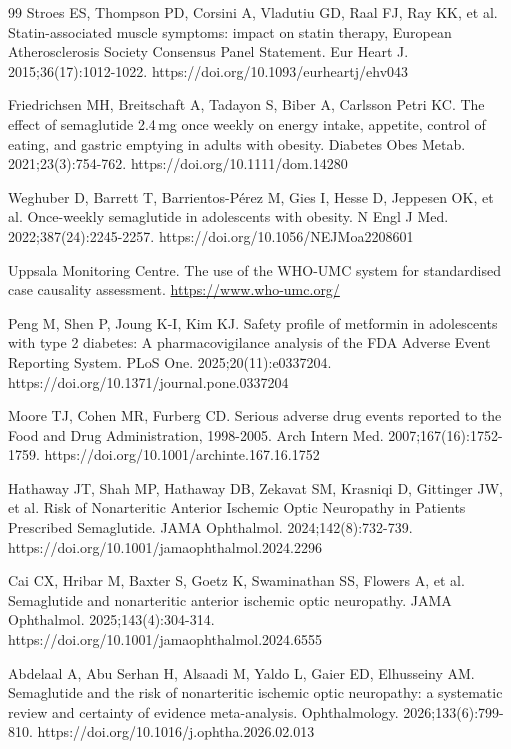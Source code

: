 \documentclass[10pt,a4paper]{article}
\begin{document}
\begin{thebibliography}{99}
Stroes ES, Thompson PD, Corsini A, Vladutiu GD, Raal FJ, Ray KK, et al.
Statin-associated muscle symptoms: impact on statin therapy, European Atherosclerosis Society Consensus Panel Statement.
Eur Heart J. 2015;36(17):1012-1022.
https://doi.org/10.1093/eurheartj/ehv043

Friedrichsen MH, Breitschaft A, Tadayon S, Biber A, Carlsson Petri KC.
The effect of semaglutide 2.4\,mg once weekly on energy intake, appetite, control of eating, and gastric emptying in adults with obesity.
Diabetes Obes Metab. 2021;23(3):754-762.
https://doi.org/10.1111/dom.14280

Weghuber D, Barrett T, Barrientos-P\'{e}rez M, Gies I, Hesse D, Jeppesen OK, et al.
Once-weekly semaglutide in adolescents with obesity.
N Engl J Med. 2022;387(24):2245-2257.
https://doi.org/10.1056/NEJMoa2208601

Uppsala Monitoring Centre.
The use of the WHO-UMC system for standardised case causality assessment.
\url{https://www.who-umc.org/}

Peng M, Shen P, Joung K-I, Kim KJ.
Safety profile of metformin in adolescents with type 2 diabetes: A pharmacovigilance analysis of the FDA Adverse Event Reporting System.
PLoS One. 2025;20(11):e0337204.
https://doi.org/10.1371/journal.pone.0337204

Moore TJ, Cohen MR, Furberg CD.
Serious adverse drug events reported to the Food and Drug Administration, 1998-2005.
Arch Intern Med. 2007;167(16):1752-1759.
https://doi.org/10.1001/archinte.167.16.1752

Hathaway JT, Shah MP, Hathaway DB, Zekavat SM, Krasniqi D, Gittinger JW, et al.
Risk of Nonarteritic Anterior Ischemic Optic Neuropathy in Patients Prescribed Semaglutide.
JAMA Ophthalmol. 2024;142(8):732-739.
https://doi.org/10.1001/jamaophthalmol.2024.2296

Cai CX, Hribar M, Baxter S, Goetz K, Swaminathan SS, Flowers A, et al. Semaglutide and nonarteritic anterior ischemic optic neuropathy. JAMA Ophthalmol. 2025;143(4):304-314. https://doi.org/10.1001/jamaophthalmol.2024.6555

Abdelaal A, Abu Serhan H, Alsaadi M, Yaldo L, Gaier ED, Elhusseiny AM. Semaglutide and the risk of nonarteritic ischemic optic neuropathy: a systematic review and certainty of evidence meta-analysis. Ophthalmology. 2026;133(6):799-810. https://doi.org/10.1016/j.ophtha.2026.02.013


\end{thebibliography}
\end{document}
